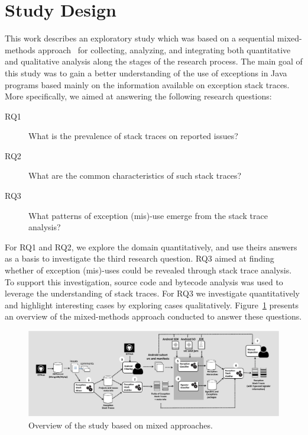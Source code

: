 \documentclass[conference]{IEEEtran}
\begin{document}
\section{Study Design}

This work describes an exploratory study which was based on a sequential
mixed-methods approach~\cite{ivankova2006using} for collecting, analyzing, and
integrating both quantitative and qualitative analysis along the stages of the
research process. The main goal of this study was to gain a better understanding
of the use of exceptions in Java programs based mainly on the information
available on exception stack traces. More specifically, we aimed at answering
the following research questions:

\begin{description}

  \item[RQ1] What is the prevalence of stack traces on  reported issues?

  \item[RQ2] What are the common characteristics of such stack traces?

  \item[RQ3] What patterns of exception (mis)-use emerge from the stack trace
    analysis?

\end{description}

For RQ1 and RQ2, we explore the domain quantitatively, and use theirs answers as
a basis to investigate the third research question. RQ3 aimed at finding whether
of exception (mis)-uses could be revealed through stack trace analysis. To
support this investigation, source code and bytecode analysis was used to
leverage the  understanding of stack traces. For RQ3 we investigate
quantitatively and highlight interesting cases by exploring cases qualitatively.
Figure~\ref{fig:overviewfig} presents an overview of the mixed-methods approach
conducted to answer these questions.

\begin{figure}
\centering
\includegraphics[width=\hsize]{overview.pdf}
\caption{Overview of the study based on mixed approaches.}
\label{fig:overviewfig}
\end{figure}
\end{document}
